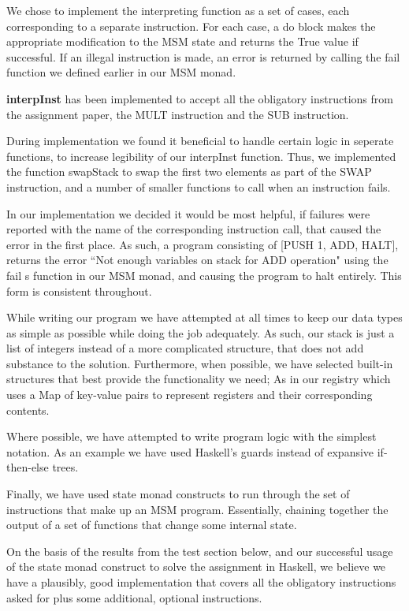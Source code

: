 \documentclass[]{article}
\begin{document}
We chose to implement the interpreting function as a set of cases, each corresponding to a separate instruction. For each case, a do block makes the appropriate modification to the MSM state and returns the True value if successful. If an illegal instruction is made, an error is returned by calling the fail function we defined earlier in our MSM monad.\par
\textbf{interpInst} has been implemented to accept all the obligatory instructions from the assignment paper, the MULT instruction and the SUB instruction.\par
During implementation we found it beneficial to handle certain logic in seperate functions, to increase legibility of our interpInst function. Thus, we implemented the function swapStack to swap the first two elements as part of the SWAP instruction, and a number of smaller functions to call when an instruction fails.\par
In our implementation we decided it would be most helpful, if failures were reported with the name of the corresponding instruction call, that caused the error in the first place. As such, a program consisting of [PUSH 1, ADD, HALT], returns the error “Not enough variables on stack for ADD operation" using the fail s function in our MSM monad, and causing the program to halt entirely. This form is consistent throughout.\par
While writing our program we have attempted at all times to keep our data types as simple as possible while doing the job adequately. As such, our stack is just a list of integers instead of a more complicated structure, that does not add substance to the solution. Furthermore, when possible, we have selected built-in structures that best provide the functionality we need; As in our registry which uses a Map of key-value pairs to represent registers and their corresponding contents.\par
Where possible, we have attempted to write program logic with the simplest notation. As an example we have used Haskell’s guards instead of expansive if-then-else trees.\par
Finally, we have used state monad constructs to run through the set of instructions that make up an MSM program. Essentially, chaining together the output of a set of functions that change some internal state.\par
On the basis of the results from the test section below, and our successful usage of the state monad construct to solve the assignment in Haskell, we believe we have a plausibly, good implementation that covers all the obligatory instructions asked for plus some additional, optional instructions.   \par
\end{document}

